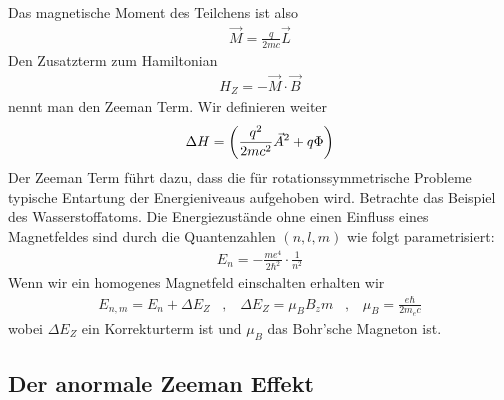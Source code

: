 Das magnetische Moment des Teilchens ist also
\begin{align*}
    \vec{M} = \frac{q}{2mc} \vec{L}
\end{align*}
Den Zusatzterm zum Hamiltonian
\begin{align*}
    H_Z = - \vec{M} \cdot \vec{B}
\end{align*}
nennt man den Zeeman Term. Wir definieren weiter
\begin{align*}
    \Delta H = \left( \frac{q^2}{2mc^2} \vec{A}^2 + q \Phi \right)
\end{align*}
Der Zeeman Term führt dazu, dass die für rotationssymmetrische Probleme
typische Entartung der Energieniveaus aufgehoben wird. Betrachte das Beispiel
des Wasserstoffatoms. Die Energiezustände ohne einen Einfluss eines Magnetfeldes
sind durch die Quantenzahlen $(n,l,m)$ wie folgt parametrisiert:
\begin{align*}
    E_n = - \frac{me^4}{2\hbar^2} \cdot \frac{1}{n^2}
\end{align*}
Wenn wir ein homogenes Magnetfeld einschalten erhalten wir
\begin{align*}
    E_{n,m} = E_n + \Delta E_Z
    \hspace{10pt} , \hspace{10pt}
    \Delta E_Z = \mu_B B_z m
    \hspace{10pt} , \hspace{10pt}
    \mu_B = \frac{e \hbar}{2 m_e c}
\end{align*}
wobei $\Delta E_Z$ ein Korrekturterm ist und $\mu_B$ das Bohr'sche Magneton
ist.

\subsection{Der anormale Zeeman Effekt}

